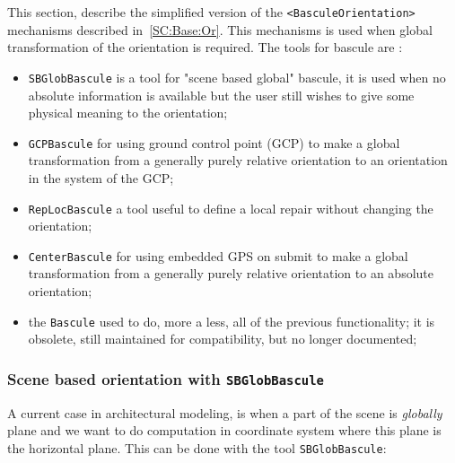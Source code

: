 \label{BASCULE}
This section, describe the simplified version of the {\tt <BasculeOrientation>} mechanisms
described in~\ref{SC:Base:Or}. This mechanisms is used when global transformation of the
orientation is required. The tools for bascule are :

\begin{itemize}

   \item {\tt SBGlobBascule}  is a tool for "scene based global" bascule,
	 it is used when no absolute information is available but the user
	 still wishes to give some physical meaning to the orientation;

   \item {\tt GCPBascule}  for using ground control point (GCP) to make
	 a global transformation from a generally purely relative orientation
	 to an orientation in the system of the GCP;

   \item {\tt RepLocBascule} a tool useful to define a local repair without
	 changing the orientation;

   \item {\tt CenterBascule}  for using embedded GPS on submit  to make
	 a global transformation from a generally purely relative orientation
	 to an absolute orientation;

   \item   the {\tt Bascule} used to do, more a less, all of the previous
	   functionality; it is obsolete, still maintained for compatibility,
	   but no longer documented;
\end{itemize}


\subsubsection{Scene based orientation with {\tt SBGlobBascule}}

\label{ScBas:Basc}

A current case in architectural modeling, is when a part of the
scene is \emph{globally} plane and we want to do computation in
coordinate system where this plane is the horizontal plane.
This can be done with the tool {\tt SBGlobBascule}:



